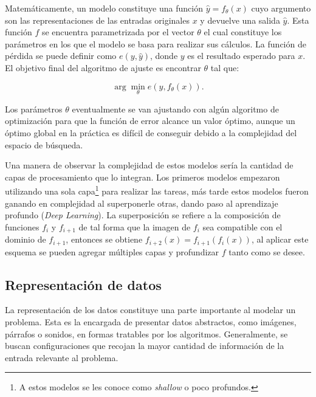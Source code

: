 Matemáticamente, un modelo constituye una función $\hat{y} = f_{\theta}(x)$ cuyo argumento son las 
representaciones de las entradas originales $x$ y devuelve una salida $\hat{y}$. Esta función $f$ se encuentra
parametrizada por el vector $\theta$ el cual constituye los parámetros en los que el modelo se basa para realizar sus
cálculos. La función de pérdida se puede definir como $e(y, \hat{y})$, donde $y$ es el resultado esperado para $x$. 
El objetivo final del algoritmo de ajuste es encontrar $\theta$ tal que:

\begin{equation}
	\arg \min_{\theta} e(y, f_{\theta}(x)).
\end{equation}\label{eq:arg_min_theta}

Los parámetros $\theta$ eventualmente se van ajustando con algún algoritmo de optimización para que 
la función de error alcance un valor óptimo, aunque un óptimo global en la práctica es difícil de conseguir
debido a la complejidad del espacio de búsqueda.

Una manera de observar la complejidad de estos modelos sería la cantidad de capas de procesamiento que lo integran.
Los primeros modelos empezaron utilizando una sola capa\footnote{A estos modelos se les conoce 
como \emph{shallow} o poco profundos.} para realizar 
las tareas, más tarde estos modelos fueron ganando en complejidad al superponerle otras, dando paso al 
aprendizaje profundo (\emph{Deep Learning}). La superposición se refiere
a la composición de funciones $f_i$ y $f_{i+1}$ de tal forma que la imagen de $f_i$ sea compatible con el dominio de 
$f_{i+1}$, entonces se obtiene $f_{i+2}(x) = f_{i+1}(f_i(x))$, al aplicar este esquema se pueden agregar múltiples
capas y profundizar $f$ tanto como se desee.


\subsection{Representación de datos}

La representación de los datos constituye una parte importante al modelar un problema. Esta 
es la encargada de presentar datos abstractos, como imágenes, párrafos o sonidos, en formas tratables
por los algoritmos. Generalmente, se buscan configuraciones que recojan la mayor cantidad de información 
de la entrada relevante al problema.

